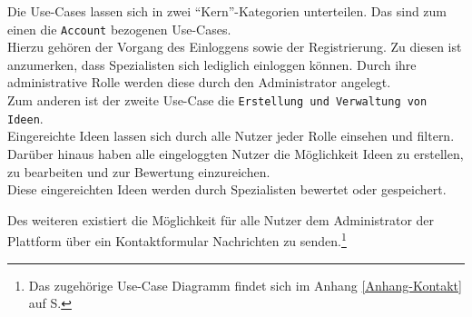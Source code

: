 Die Use-Cases lassen sich in zwei \enquote{Kern}-Kategorien unterteilen.
Das sind zum einen die \texttt{Account} bezogenen Use-Cases.\\
Hierzu gehören der Vorgang des Einloggens sowie der Registrierung.
Zu diesen ist anzumerken, dass Spezialisten sich lediglich einloggen können.
Durch ihre administrative Rolle werden diese durch den Administrator angelegt.\\
Zum anderen ist der zweite Use-Case die \texttt{Erstellung und Verwaltung von Ideen}.\\
Eingereichte Ideen lassen sich durch alle Nutzer jeder Rolle einsehen und filtern. Darüber hinaus haben alle eingeloggten Nutzer die Möglichkeit Ideen zu erstellen, zu bearbeiten und zur Bewertung einzureichen.\\
Diese eingereichten Ideen werden durch Spezialisten bewertet oder gespeichert.

Des weiteren existiert die Möglichkeit für alle Nutzer dem Administrator der Plattform über ein Kontaktformular Nachrichten zu senden.\footnote{Das zugehörige Use-Case Diagramm findet sich im Anhang \ref{Anhang-Kontakt} auf S.\pageref{Anhang-Kontakt}}